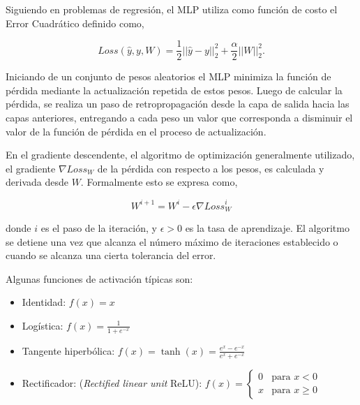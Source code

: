 \documentclass[spanish]{article}
\begin{document}
          Siguiendo en problemas de regresión, el MLP utiliza como función de costo el Error Cuadrático 
          definido como,
          
          \begin{equation}
            Loss(\hat{y},y,W) = \frac{1}{2}||\hat{y} - y ||_2^2 + \frac{\alpha}{2} ||W||_2^2.
          \end{equation}

          Iniciando de un conjunto de pesos aleatorios el MLP minimiza la función de pérdida mediante 
          la actualización repetida de estos pesos. Luego de calcular la pérdida, se realiza un paso de 
          retropropagación desde la capa de salida hacia las capas anteriores, entregando a cada peso un 
          valor que corresponda a disminuir el valor de la función de pérdida en el proceso de actualización. \medskip

          En el gradiente descendente, el algoritmo de optimización generalmente utilizado, el gradiente 
          $\nabla Loss_{W}$  de la pérdida con respecto a los pesos, es calculada y derivada desde $W$. 
          Formalmente esto se expresa como,

          \begin{equation}
            W^{i+1} = W^i - \epsilon \nabla {Loss}_{W}^{i}
          \end{equation}
              
          donde $i$ es el paso de la iteración, y $\epsilon > 0$ es la tasa de aprendizaje. El algoritmo 
          se detiene una vez que alcanza el número máximo de iteraciones establecido o cuando se alcanza 
          una cierta tolerancia del error. \medskip
          
          Algunas funciones de activación típicas son:
          \begin{itemize}
            \item Identidad: $f(x)=x$
            \item Logística: $f(x)=\frac{1}{1+e^{-x}}$
            \item Tangente hiperbólica: $f(x)=\tanh(x)=\frac{e^x - e^{-x}}{e^x + e^{-x}}$
            \item Rectificador: (\emph{Rectified linear unit} ReLU): 
              $f(x)=\begin{cases} 0 & \text{para } x < 0 \\ x & \text{para } x \geq 0 \end{cases}$ 
          \end{itemize}
              
\end{document}
